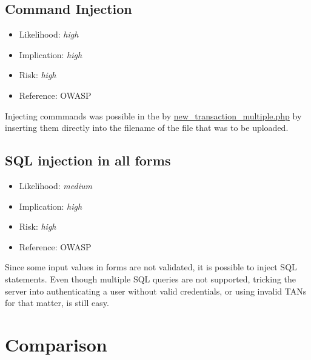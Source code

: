 \subsection{Command Injection} \label{over:command_injection}
\begin{itemize}
	\item Likelihood: \textit{high}
	\item Implication: \textit{high}
	\item Risk: \textit{high}
	\item Reference: OWASP 
\end{itemize}
Injecting commmands was possible in the by \url{new\_transaction\_multiple.php} by inserting them directly into the filename of the file that was to be uploaded.

\subsection{SQL injection in all forms} \label{over:sqlgnb}
\begin{itemize}
	\item Likelihood: \textit{medium}
	\item Implication: \textit{high}
	\item Risk: \textit{high}
	\item Reference: OWASP 
\end{itemize}
Since some input values in forms are not validated, it is possible to inject SQL statements. Even though multiple SQL queries are not supported, tricking the server into authenticating a user without valid credentials, or using invalid TANs for that matter, is still easy.
\clearpage



\section{Comparison}
